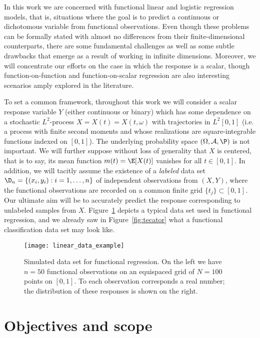 In this work we are concerned with functional linear and logistic regression models, that is, situations where the goal is to predict a continuous or dichotomous variable from functional observations. Even though these problems can be formally stated with almost no differences from their finite-dimensional counterparts, there are some fundamental challenges as well as some subtle drawbacks that emerge as a result of working in infinite dimensions. Moreover, we will concentrate our efforts on the case in which the response is a scalar, though function-on-function and function-on-scalar regression are also interesting scenarios amply explored in the literature.

To set a common framework, throughout this work we will consider a scalar response variable \(Y\) (either continuous or binary) which has some dependence on a stochastic \(L^2\)-process \(X=X(t)=X(t, \omega)\) with trajectories in \(L^2[0, 1]\) (i.e. a process with finite second moments and whose realizations are square-integrable functions indexed on \([0,1]\)). The underlying probability space \((\Omega, \mathcal A, \P)\) is not important. We will further suppose without loss of generality that \(X\) is centered, that is to say, its mean function \(m(t)=\E[X(t)]\) vanishes for all \(t\in[0,1]\). In addition, we will tacitly assume the existence of a \textit{labeled} data set \(\D_n =\{(x_i, y_i): i=1,\dots, n\}\) of independent observations from \((X, Y)\), where the functional observations are recorded on a common finite grid \(\{t_j\}\subset [0, 1]\). Our ultimate aim will be to accurately predict the response corresponding to unlabeled samples from \(X\). Figure~\ref{fig:linear_data_example} depicts a typical data set used in functional regression, and we already saw in Figure~\ref{fig:tecator} what a functional classification data set may look like.

\begin{figure}[ht]
  \centering
  \texttt{[image: linear\_data\_example]}
  \caption{Simulated data set for functional regression. On the left we have \(n=50\) functional observations on an equispaced grid of \(N=100\) points on \([0,1]\). To each observation corresponds a real number; the distribution of these responses is shown on the right.}\label{fig:linear_data_example}
\end{figure}


\section{Objectives and scope}

